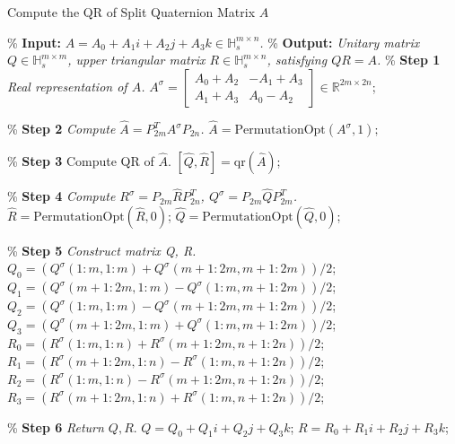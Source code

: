 \documentclass[conference]{IEEEtran}
\numberwithin{equation}{section}
\begin{document}
\begin{algorithm}[htbp] 
    \caption{Compute the QR of Split Quaternion Matrix \(A\)}
    \label{alg:QR}
    \begin{algorithmic}[1]
        \State \% \textbf{Input:} \textit{\(A = A_0 + A_1 i + A_2 j + A_3 k \in \mathbb{H}_s^{m\times n}\).}
        \State \% \textbf{Output:} \textit{Unitary matrix \(Q \in \mathbb{H}_s^{m\times m}\), upper triangular matrix \(R \in \mathbb{H}_s^{m\times n}\), satisfying \(Q  R = A\).}
        \State
        \State \% \textbf{Step 1} \textit{Real representation of $A$.}
        \State \(A^\sigma = \begin{bmatrix}
            A_0 + A_2 & -A_1 + A_3 \\ 
            A_1 + A_3 & A_0 - A_2
            \end{bmatrix} \in \mathbb{R}^{2m\times 2n}\); 
        
        \State
        \State \% \textbf{Step 2} \textit{Compute \(\widehat{A} = P_{2m}^T A^\sigma P_{2n}\).}
        \State $\widehat{A}=\text{PermutationOpt}(A^\sigma,1);$  
        
        \State
        \State \% \textbf{Step 3} Compute QR of $\widehat{A}$.
        \State \([\widehat{Q},\widehat{R}] = \text{qr}(\widehat{A})\); 
        
        \State
        \State \% \textbf{Step 4} \textit{Compute \(R^\sigma = P_{2m}\widehat{R}P_{2n}^T\), \(Q^\sigma = P_{2m}\widehat{Q}P_{2m}^T\). }
        \State $\widehat{R}=\text{PermutationOpt}(\widehat{R},0)$;
        \State $\widehat{Q}=\text{PermutationOpt}(\widehat{Q},0)$;
        
        \State
        \State \% \textbf{Step 5} \textit{Construct matrix Q, R.}
        \State $Q_0 = (Q^\sigma(1\!:\!m,1\!:\!m) + Q^\sigma(m+1\!:\!2m,m+1\!:\!2m))/2$;
        \State $Q_1 = (Q^\sigma(m+1\!:\!2m,1\!:\!m) - Q^\sigma(1\!:\!m,m+1\!:\!2m))/2$;
        \State $Q_2 = (Q^\sigma(1\!:\!m,1\!:\!m) - Q^\sigma(m+1\!:\!2m,m+1\!:\!2m))/2$;
        \State $Q_3 = (Q^\sigma(m+1\!:\!2m,1\!:\!m) + Q^\sigma(1\!:\!m,m+1\!:\!2m))/2$;
        \State $R_0 = (R^\sigma(1\!:\!m,1\!:\!n) + R^\sigma(m+1\!:\!2m,n+1\!:\!2n))/2$;
        \State $R_1 = (R^\sigma(m+1\!:\!2m,1\!:\!n) - R^\sigma(1\!:\!m,n+1\!:\!2n))/2$;
        \State $R_2 = (R^\sigma(1\!:\!m,1\!:\!n) - R^\sigma(m+1\!:\!2m,n+1\!:\!2n))/2$;
        \State $R_3 = (R^\sigma(m+1\!:\!2m,1\!:\!n) + R^\sigma(1\!:\!m,n+1\!:\!2n))/2$;

        \State
        \State \% \textbf{Step 6} \textit{Return $Q, R$}.
        \State $Q = Q_0 + Q_1i + Q_2j + Q_3k$; 
        \State $R = R_0 + R_1i + R_2j + R_3k$;
    \End 
    \end{algorithmic}
\end{algorithm}
\end{document}
